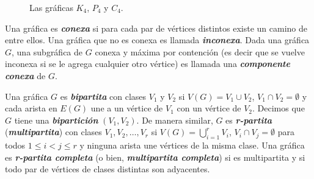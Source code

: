 \begin{figure}[!htbp]
\centering

\caption{Las gráficas $K_4$, $P_4$ y $C_4$.}
\label{fig_tipos_graficas}
\end{figure}

Una gráfica es \textbf{\emph{conexa}} si para cada par de vértices distintos existe un camino de entre ellos. Una gráfica que no es conexa es llamada \textbf{\emph{inconexa}}. Dada una gráfica $G$, una subgráfica de $G$ conexa y m\'axima por contenci\'on (es decir que se vuelve inconexa si se le agrega cualquier otro vértice) es llamada una \textbf{\emph{componente conexa}} de $G$.

Una gráfica $G$ es \textbf{\emph{bipartita}} con clases $V_1$ y $V_2$ si $V(G) = V_1 \cup V_2$, $V_1 \cap V_2 = \emptyset$ y cada arista en $E(G)$ une a un vértice de $V_1$ con un vértice de $V_2$. Decimos que $G$ tiene una \textbf{\emph{bipartición}} $(V_1,V_2)$. De manera similar, $G$ es \textbf{\emph{r-partita}} (\textbf{\emph{multipartita}}) con clases $V_1, V_2, \dots, V_r$ si $V(G) = \bigcup_{i=1}^r V_i$, $V_i \cap V_j = \emptyset$ para todos $1\leq i < j \leq r$ y ninguna arista une vértices de la misma clase. Una gráfica es \textbf{\emph{r-partita completa}} (o bien, \textbf{\emph{multipartita completa}}) si es multipartita y si todo par de vértices de clases distintas son adyacentes.

